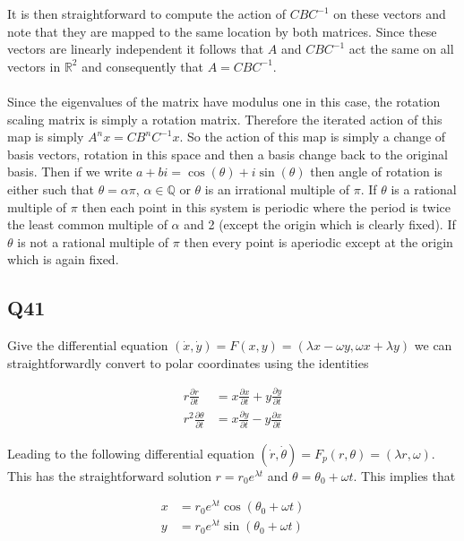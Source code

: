 \documentclass{article}
\begin{document}
It is then straightforward to compute the action of $CBC^{-1}$ on these vectors and note that 
they are mapped to the same location by both matrices. Since these vectors are linearly independent 
it follows that $A$ and $CBC^{-1}$ act the same on all vectors in $\mathbb{R}^2$ and consequently 
that $A = CBC^{-1}$.

\paragraph{}
Since the eigenvalues of the matrix have modulus one in this case, the rotation scaling matrix 
is simply a rotation matrix. Therefore the iterated action of this map is simply $A^nx = CB^nC^{-1}x$. 
So the action of this map is simply a change of basis vectors, rotation in this space and then a 
basis change back to the original basis. Then if we write $a+bi=\cos(\theta) + i\sin(\theta)$ 
then angle of rotation is either such that $\theta = \alpha\pi$, $\alpha \in \mathbb{Q}$ or $\theta$ is 
an irrational multiple of $\pi$. If $\theta$ is a rational multiple of $\pi$ then each point 
in this system is periodic where the period is twice the least common multiple of $\alpha$ and 2 (except the 
origin which is clearly fixed). If $\theta$ 
is not a rational multiple of $\pi$ then every point is aperiodic except at the origin which is again 
fixed. 

\subsection*{Q41}
Give the differential equation $(\dot x, \dot y) =  F(x,y) = (\lambda x - \omega y, \omega x + \lambda y)$ we 
can straightforwardly convert to polar coordinates using the identities 

\begin{align*}
	r\frac{\partial r}{\partial t} &= x\frac{\partial x}{\partial t} + y\frac{\partial y}{\partial t} \\
	r^2\frac{\partial\theta}{\partial t} &= x\frac{\partial y}{\partial t} - y\frac{\partial x}{\partial t}
\end{align*}

Leading to the following differential equation $(\dot r, \dot \theta ) = F_p (r,\theta) = (\lambda r,\omega)$. This 
has the straightforward solution $r = r_0e^{\lambda t}$ and $\theta = \theta_0 + \omega t$. 
This implies that 

\begin{align*}
	x &= r_0e^{\lambda t}\cos(\theta_0 + \omega t) \\
	y &= r_0e^{\lambda t}\sin(\theta_0 + \omega t)
\end{align*}
\end{document}
